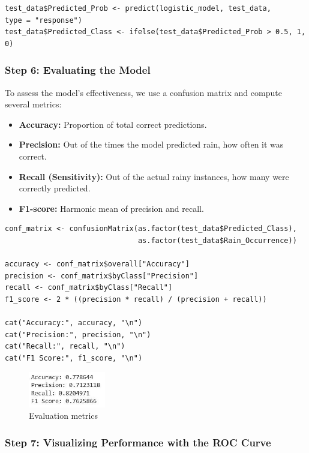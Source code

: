 \begin{verbatim}
test_data$Predicted_Prob <- predict(logistic_model, test_data,
type = "response")
test_data$Predicted_Class <- ifelse(test_data$Predicted_Prob > 0.5, 1, 0)
\end{verbatim}

\subsubsection*{Step 6: Evaluating the Model}

To assess the model’s effectiveness, we use a confusion matrix and compute several metrics:

\begin{itemize}
  \item \textbf{Accuracy:} Proportion of total correct predictions.
  \item \textbf{Precision:} Out of the times the model predicted rain, how often it was correct.
  \item \textbf{Recall (Sensitivity):} Out of the actual rainy instances, how many were correctly predicted.
  \item \textbf{F1-score:} Harmonic mean of precision and recall.
\end{itemize}

\begin{verbatim}
conf_matrix <- confusionMatrix(as.factor(test_data$Predicted_Class),
                               as.factor(test_data$Rain_Occurrence))

accuracy <- conf_matrix$overall["Accuracy"]
precision <- conf_matrix$byClass["Precision"]
recall <- conf_matrix$byClass["Recall"]
f1_score <- 2 * ((precision * recall) / (precision + recall))

cat("Accuracy:", accuracy, "\n")
cat("Precision:", precision, "\n")
cat("Recall:", recall, "\n")
cat("F1 Score:", f1_score, "\n")
\end{verbatim}

\begin{figure}[h]
\centering
\includegraphics[width=0.3\textwidth]{figures/eval_metrics.jpg}
\caption{Evaluation metrics}
\end{figure}

\subsubsection*{Step 7: Visualizing Performance with the ROC Curve}

